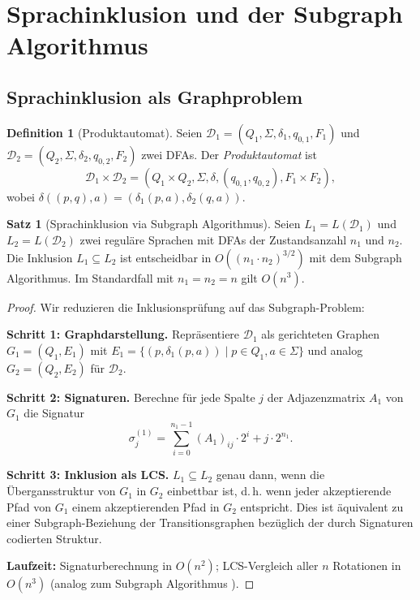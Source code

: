 ﻿\documentclass[a4paper,12pt]{article}
\theoremstyle{definition}
\newtheorem{definition}{Definition}
\newtheorem{satz}{Satz}
\begin{document}
\section{Sprachinklusion und der Subgraph Algorithmus}

\subsection{Sprachinklusion als Graphproblem}

\begin{definition}[Produktautomat]
	Seien $\mathcal{D}_1 = (Q_1, \Sigma, \delta_1, q_{0,1}, F_1)$ und
	$\mathcal{D}_2 = (Q_2, \Sigma, \delta_2, q_{0,2}, F_2)$ zwei DFAs. Der
	\emph{Produktautomat} ist
	\[
		\mathcal{D}_1 \times \mathcal{D}_2 = (Q_1 \times Q_2, \Sigma,
		\delta, (q_{0,1}, q_{0,2}), F_1 \times F_2),
	\]
	wobei $\delta((p, q), a) = (\delta_1(p,a), \delta_2(q,a))$.
\end{definition}

\begin{satz}[Sprachinklusion via Subgraph Algorithmus]
	\label{satz:inklusion}
	Seien $L_1 = L(\mathcal{D}_1)$ und $L_2 = L(\mathcal{D}_2)$ zwei reguläre
	Sprachen mit DFAs der Zustandsanzahl $n_1$ und $n_2$. Die Inklusion
	$L_1 \subseteq L_2$ ist entscheidbar in $O((n_1 \cdot n_2)^{3/2})$ mit dem
	Subgraph Algorithmus. Im Standardfall mit $n_1 = n_2 = n$ gilt $O(n^3)$.
\end{satz}

\begin{proof}
	Wir reduzieren die Inklusionsprüfung auf das Subgraph-Problem:

	\textbf{Schritt 1: Graphdarstellung.}
	Repräsentiere $\mathcal{D}_1$ als gerichteten Graphen $G_1 = (Q_1, E_1)$ mit
	$E_1 = \{(p, \delta_1(p,a)) \mid p \in Q_1, a \in \Sigma\}$ und analog
	$G_2 = (Q_2, E_2)$ für $\mathcal{D}_2$.

	\textbf{Schritt 2: Signaturen.}
	Berechne für jede Spalte $j$ der Adjazenzmatrix $A_1$ von $G_1$ die Signatur
	\[
		\sigma_j^{(1)} = \sum_{i=0}^{n_1-1} (A_1)_{ij} \cdot 2^i + j \cdot 2^{n_1}.
	\]

	\textbf{Schritt 3: Inklusion als LCS.}
	$L_1 \subseteq L_2$ genau dann, wenn die Übergansstruktur von $G_1$ in $G_2$
	einbettbar ist, d.\,h. wenn jeder akzeptierende Pfad von $G_1$ einem
	akzeptierenden Pfad in $G_2$ entspricht. Dies ist äquivalent zu einer
	Subgraph-Beziehung der Transitionsgraphen bezüglich der durch Signaturen
	codierten Struktur.

	\textbf{Laufzeit:} Signaturberechnung in $O(n^2)$; LCS-Vergleich aller
	$n$ Rotationen in $O(n^3)$ (analog zum Subgraph Algorithmus \cite{epp2026}).
	\qedhere
\end{proof}
\end{document}
